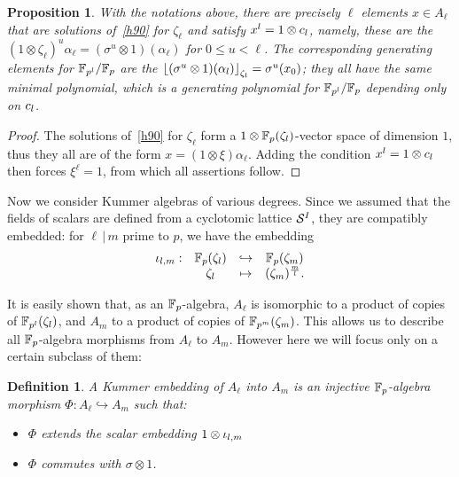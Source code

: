 \documentclass{sig-alternate}
\newtheorem{proposition}[theorem]{Proposition}
\newtheorem{definition}[theorem]{Definition}
\begin{document}
\begin{proposition}
\label{depend}
With the notations above, there are precisely $\ell$ elements $x\in A_\ell$ that are solutions of~\eqref{h90} for $\zeta_\ell$
and satisfy $x^l=1\otimes c_l$, namely, these are the $(1\otimes\zeta_\ell)^u\alpha_\ell=(\sigma^u\otimes 1)(\alpha_\ell)$
for $0\leq u<\ell$.
The corresponding generating elements for $\mathbb{F}_{p^l}/\mathbb{F}_{p}$ are the $\left\lfloor (\sigma^u\otimes 1)(\alpha_l) \right\rfloor_{\zeta_l}=\sigma^u(x_0)$;
they all have the same minimal polynomial, which is a generating polynomial for $\mathbb{F}_{p^l}/\mathbb{F}_{p}$ depending only on $c_l$.
\end{proposition}
\begin{proof}
The solutions of~\eqref{h90} for $\zeta_\ell$ form a $1\otimes\mathbb{F}_{p}(\zeta_{l})$-vector space of dimension $1$,
thus they all are of the form $x=(1\otimes\xi)\alpha_\ell$.
Adding the condition $x^l=1\otimes c_l$ then forces $\xi^\ell=1$,
from which all assertions follow.
\end{proof}

Now we consider Kummer algebras of various degrees.
Since we assumed that the fields of scalars are defined from a cyclotomic lattice $\mathcal{S}^{I}$,
they are compatibly embedded:
for $\ell\,|\,m$ prime to $p$, we have the embedding
\[
\begin{array}{cccc}
  {\iota_{{l},{m}}}: & \mathbb{F}_{p}(\zeta_l) & \hookrightarrow & \mathbb{F}_{p}(\zeta_m) \\
  & \zeta_l & \mapsto & (\zeta_{m})^{\frac{m}{l}}.
\end{array}
\]

It is easily shown that, as an $\mathbb{F}_{p}$-algebra, $A_\ell$ is isomorphic to a product of copies of $\mathbb{F}_{p^l}(\zeta_l)$,
and $A_m$ to a product of copies of $\mathbb{F}_{p^m}(\zeta_m)$.
This allows us to describe all $\mathbb{F}_{p}$-algebra morphisms from $A_\ell$ to $A_m$. However here we will focus only on a certain
subclass of them:
\begin{definition}
\label{Kembedding}
A \emph{Kummer embedding} of $A_\ell$ into $A_m$ is an \emph{injective} $\mathbb{F}_{p}$-algebra morphism $\Phi:A_\ell\hookrightarrow A_m$
such that:
\begin{itemize}
\item $\Phi$ extends the scalar embedding $1\otimes{\iota_{{l},{m}}}$
\item $\Phi$ commutes with $\sigma\otimes1$.
\end{itemize}
\end{definition}
\end{document}
